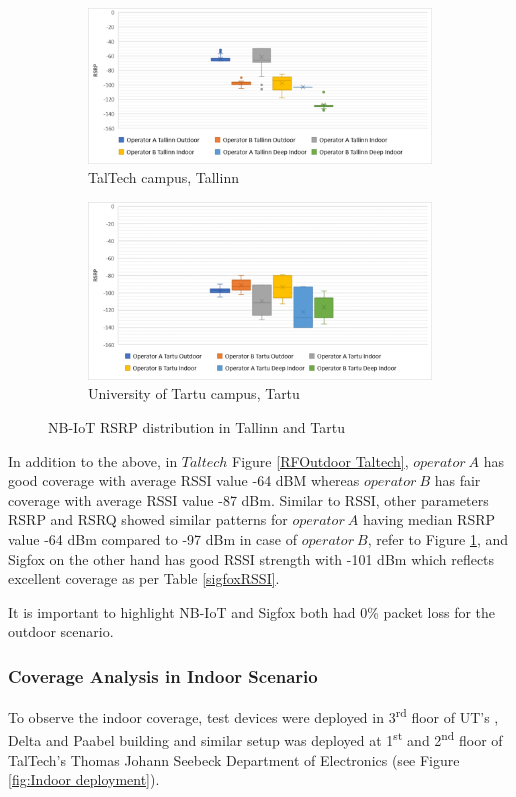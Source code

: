 \documentclass[12pt]{article}
\begin{document}
 \begin{figure}[H]
\begin{subfigure}[t]{\linewidth}
  \centering
  \includegraphics[width=.5\linewidth]{Images/tallinn/TallinnRSRPboxplot.pdf}  
  \caption{TalTech campus, Tallinn}
\end{subfigure}
\begin{subfigure}[t]{\linewidth}
  \centering
  \includegraphics[width=.5\linewidth]{Images/tartu/TartuRSRPboxplot.pdf}  
  \caption{University of Tartu campus, Tartu}
  
\end{subfigure}
\caption{NB-IoT RSRP distribution in Tallinn and Tartu}
 \label{boxplot}
\end{figure}






In addition to the above, in $Taltech$ Figure \ref{RFOutdoor Taltech}, $operator\ A$ has good coverage with average RSSI value -64 dBM whereas $operator\ B$ has fair coverage with average RSSI value -87 dBm. Similar to RSSI, other parameters RSRP and RSRQ showed similar patterns for $operator\ A$ having median RSRP value -64 dBm compared to -97 dBm in case of $operator\ B$, refer to Figure \ref{boxplot}, and Sigfox on the other hand has good RSSI strength with -101 dBm which reflects excellent coverage as per Table \ref{sigfoxRSSI}.\par
It is important to highlight NB-IoT and Sigfox both had 0\% packet loss for the outdoor scenario.




\subsubsection{Coverage Analysis in Indoor Scenario}\label{indoor analysis}
To observe the indoor coverage, test devices were deployed in 3\textsuperscript{rd} floor of UT's , Delta and Paabel building and similar setup was deployed at 1\textsuperscript{st} and 2\textsuperscript{nd} floor of TalTech's Thomas Johann Seebeck Department of Electronics (see Figure \ref{fig:Indoor deployment}).
\end{document}
